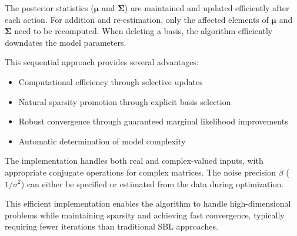 \documentclass{article}
\begin{document}
The posterior statistics ($\boldsymbol{\mu}$ and $\boldsymbol{\Sigma}$) are maintained and updated efficiently after each action. For addition and re-estimation, only the affected elements of $\boldsymbol{\mu}$ and $\boldsymbol{\Sigma}$ need to be recomputed. When deleting a basis, the algorithm efficiently downdates the model parameters.

This sequential approach provides several advantages:
\begin{itemize}
\item Computational efficiency through selective updates
\item Natural sparsity promotion through explicit basis selection
\item Robust convergence through guaranteed marginal likelihood improvements
\item Automatic determination of model complexity
\end{itemize}

The implementation handles both real and complex-valued inputs, with appropriate conjugate operations for complex matrices. The noise precision $\beta$ ($1/\sigma^2$) can either be specified or estimated from the data during optimization.

This efficient implementation enables the algorithm to handle high-dimensional problems while maintaining sparsity and achieving fast convergence, typically requiring fewer iterations than traditional SBL approaches.


    
\end{document}
